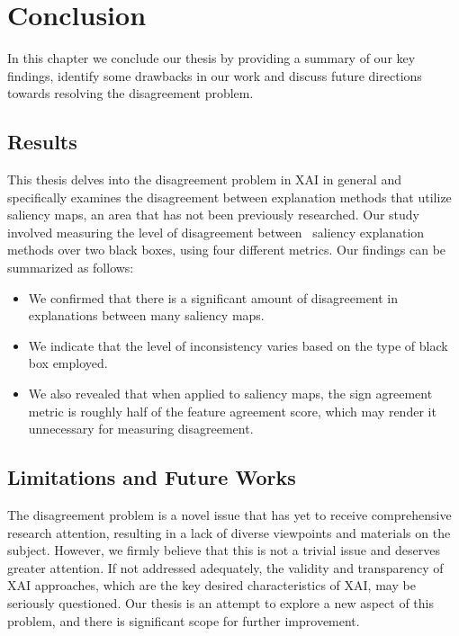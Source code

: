 \chapter{Conclusion}
\label{ch:conclusion}
In this chapter we conclude our thesis by providing a summary of our key findings, identify some drawbacks in our work and discuss future directions towards resolving the disagreement problem.

\section{Results}
This thesis delves into the disagreement problem in XAI in general and specifically examines the disagreement between explanation methods that utilize saliency maps, an area that has not been previously researched. Our study involved measuring the level of disagreement between \numExperimentedMethods\ saliency explanation methods over two black boxes, using four different metrics. Our findings can be summarized as follows:
\begin{itemize}
    \item We confirmed that there is a significant amount of disagreement in explanations between many saliency maps.
    \item We indicate that the level of inconsistency varies based on the type of black box employed.
    \item We also revealed that when applied to saliency maps, the sign agreement metric is roughly half of the feature agreement score, which may render it unnecessary for measuring disagreement.
\end{itemize}


\section{Limitations and Future Works}
\label{sec:futureWorks}
The disagreement problem is a novel issue that has yet to receive comprehensive research attention, resulting in a lack of diverse viewpoints and materials on the subject. However, we firmly believe that this is not a trivial issue and deserves greater attention. If not addressed adequately, the validity and transparency of XAI approaches, which are the key desired characteristics of XAI, may be seriously questioned. Our thesis is an attempt to explore a new aspect of this problem, and there is significant scope for further improvement.

